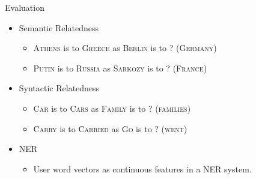 \begin{frame}{Evaluation}
  \begin{itemize}
  \item Semantic Relatedness %
    \begin{itemize}
    \item \textsc{Athens} is to \textsc{Greece} as \textsc{Berlin} is to ? (\textsc{Germany})
    \item \textsc{Putin} is to \textsc{Russia} as \textsc{Sarkozy} is to ? (\textsc{France})
    \end{itemize}
  \item Syntactic Relatedness %
    \begin{itemize}
    \item \textsc{Car} is to \textsc{Cars} as \textsc{Family} is to ? (\textsc{families})
    \item \textsc{Carry} is to \textsc{Carried} as \textsc{Go} is to ? (\textsc{went})
    \end{itemize}
  \item NER 
    \begin{itemize}
    \item User word vectors as continuous features in a NER system.
    \end{itemize}
  \end{itemize}
\end{frame}

